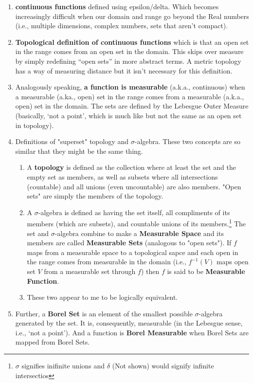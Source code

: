 \documentclass[10pt,a4paper]{report}
\begin{document}
\begin{enumerate}
    \item  \textbf{continuous functions} defined using epsilon/delta.  Which becomes increasingly difficult when our domain and range go beyond the Real numbers (i.e., multiple dimensions, complex numbers, sets that aren’t compact).
    \item  \textbf{Topological definition of continuous functions} which is that an open set in the range comes from an open set in the domain.  This skips over measure by simply redefining “open sets” in more abstract terms.  A metric topology has a way of measuring distance but it isn’t necessary for this definition.
    \item  Analogously speaking, \textbf{a function is measurable} (a.k.a., continuous) when a measurable (a.ka., open) set in the range comes from a measurable (a.k.a., open) set in the domain.  The sets are defined by the Lebesgue Outer Measure (basically, ‘not a point’, which is much like but not the same as an open set in topology).
    \item Definitions of "superset" topology and $\sigma$-algebra.  These two concepts are so similar that they might be the same thing.
    \begin{enumerate}
    		\item A \textbf{topology} is defined as the collection where at least the set and the empty set as members, as well as subsets where all intersections (countable) and all unions (even uncountable) are also members.  "Open sets" are simply the members of the topology.
    		\item A $\sigma$-algebra is defined as having the set itself, all compliments of its members (which are subsets), and countable unions of its members.\footnote{$\sigma$ signifies inifinite unions and $\delta$ (Not shown) would signify infinite intersectios} The set and $\sigma$-algebra combine to make a \textbf{Measurable Space} and its members are called \textbf{Measurable Sets} (analogous to "open sets"). If $f$ maps from a measurable space to a topological sapce and each open in the range comes from measurable in the domain (i.e., $f^{-1}(V)$ maps open set $V$ from a measurable set through $f$) then $f$ is said to be \textbf{Measurable Function}.
    		\item These two appear to me to be logically equivalent.
	\end{enumerate}      
    \item  Further, a \textbf{Borel Set} is an element of the smallest possible $\sigma$-algebra generated by the set.  It is, consequently, measurable (in the Lebesgue sense, i.e., ‘not a point’).  And a function is \textbf{Borel Measurable} when Borel Sets are mapped from Borel Sets.

\end{enumerate}
\end{document}
